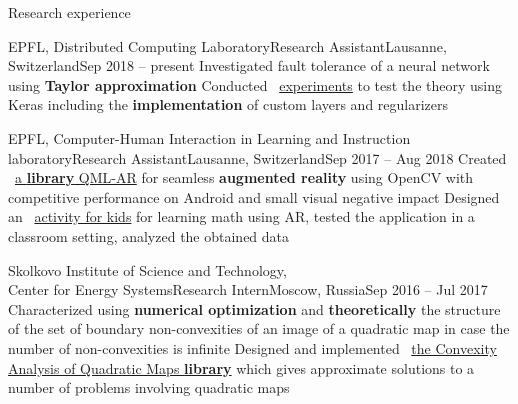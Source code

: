 \documentclass{resume} %
\newcommand{\mylink}{{\color{gray}\faExternalLink}}
\begin{document}
\begin{rSection}{Research experience}

	\begin{rSubsection}{EPFL, Distributed Computing Laboratory}{Research Assistant}{Lausanne, Switzerland}{Sep 2018 -- present}
		\myitem Investigated fault tolerance of a neural network using {\bf Taylor approximation}
		\myitem Conducted \mylink~\href{https://github.com/LPD-EPFL/ProbabilisticFaultToleranceNNs}{experiments} to test the theory using Keras including the {\bf implementation} of custom layers and regularizers
	\end{rSubsection}

	\begin{rSubsection}{EPFL, Computer-Human Interaction in Learning and Instruction laboratory}{Research Assistant}{Lausanne, Switzerland}{Sep 2017 -- Aug 2018}
		\myitem Created \mylink~\href{https://github.com/chili-epfl/qml-ar}{a {\color{black} \bf library} QML-AR} for seamless {\bf augmented reality} using OpenCV with competitive performance on Android and small visual negative impact
		\myitem Designed an \mylink~\href{https://youtu.be/B4-2qYsAKH4}{activity for kids} for learning math using AR, tested the application in a classroom setting, analyzed the obtained data
	\end{rSubsection}
	
	\begin{rSubsection}{Skolkovo Institute of Science and Technology, \\Center for Energy Systems}{Research Intern}{Moscow, Russia}{Sep 2016 -- Jul 2017}
		\myitem Characterized using {\bf numerical optimization} and {\bf theoretically} the structure of the set of boundary non-convexities of an image of a quadratic map in case the number of non-convexities is infinite
		\myitem Designed and implemented \mylink~\href{https://github.com/sergeivolodin/CAQM}{the Convexity Analysis of Quadratic Maps {\bf \color{black} library}} which gives approximate solutions to a number of problems involving quadratic maps
	\end{rSubsection}
	
	

\end{rSection}
\end{document}
